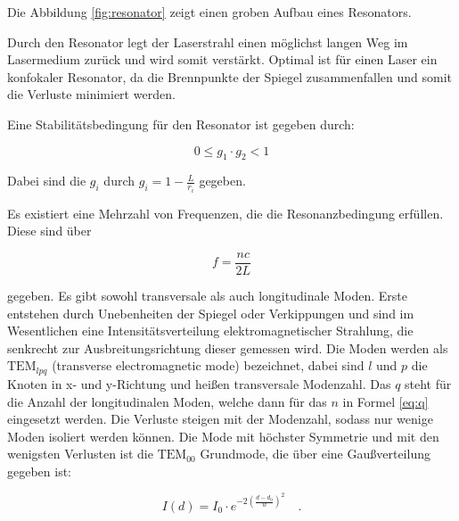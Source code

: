 \noindent Die Abbildung \ref{fig:resonator} zeigt einen groben Aufbau eines Resonators.

\noindent Durch den Resonator legt der Laserstrahl einen möglichst langen Weg im Lasermedium zurück und wird somit verstärkt. Optimal ist für einen Laser ein konfokaler Resonator, da die Brennpunkte der Spiegel zusammenfallen und somit die Verluste minimiert werden.

\noindent Eine Stabilitätsbedingung für den Resonator ist gegeben durch:

\begin{equation}
0\le g_1\cdot g_2<1
\end{equation}

\noindent Dabei sind die \(g_i\) durch \(g_i=1-\frac{L}{r_i}\) gegeben.

\noindent Es existiert eine Mehrzahl von Frequenzen, die die Resonanzbedingung erfüllen. Diese sind über 

\begin{equation}
\label{eq:q}
f=\frac{nc}{2L}
\end{equation}

\noindent gegeben. Es gibt sowohl transversale als auch longitudinale Moden. Erste entstehen durch Unebenheiten der Spiegel oder Verkippungen und sind im Wesentlichen eine Intensitätsverteilung elektromagnetischer Strahlung, die senkrecht zur Ausbreitungsrichtung dieser gemessen wird. Die Moden werden als \(\text{TEM}_{lpq}\) (transverse electromagnetic mode) bezeichnet, dabei sind \(l\) und \(p\) die Knoten in x- und y-Richtung und heißen transversale Modenzahl. Das \(q\) steht für die Anzahl der longitudinalen Moden, welche dann für das \(n\) in Formel \ref{eq:q} eingesetzt werden. Die Verluste steigen mit der Modenzahl, sodass nur wenige Moden isoliert werden können. Die Mode mit höchster Symmetrie und mit den wenigsten Verlusten ist die \(\text{TEM}_{00}\) Grundmode, die über eine Gaußverteilung gegeben ist:

\begin{equation}
\label{eq:gauß}
I(d)=I_0\cdot e^{-2\left(\frac{d-d_0}{w}\right)^2}\quad.
\end{equation}